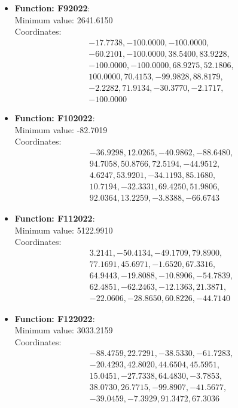 \documentclass{article}
\begin{document}
\begin{itemize}
  \item \textbf{Function: F92022}: \\
    Minimum value: 2641.6150 \\
    Coordinates:
    \[
      \begin{aligned}
        & -17.7738, -100.0000, -100.0000, \\
        & -60.2101, -100.0000, 38.5400, 83.9228, \\
        & -100.0000, -100.0000, 68.9275, 52.1806, \\
        & 100.0000, 70.4153, -99.9828, 88.8179, \\
        & -2.2282, 71.9134, -30.3770, -2.1717, \\
        & -100.0000
      \end{aligned}
    \]

  \item \textbf{Function: F102022}: \\
    Minimum value: -82.7019 \\
    Coordinates:
    \[
      \begin{aligned}
        & -36.9298, 12.0265, -40.9862, -88.6480, \\
        & 94.7058, 50.8766, 72.5194, -44.9512, \\
        & 4.6247, 53.9201, -34.1193, 85.1680, \\
        & 10.7194, -32.3331, 69.4250, 51.9806, \\
        & 92.0364, 13.2259, -3.8388, -66.6743
      \end{aligned}
    \]

  \item \textbf{Function: F112022}: \\
    Minimum value: 5122.9910 \\
    Coordinates:
    \[
      \begin{aligned}
        & 3.2141, -50.4134, -49.1709, 79.8900, \\
        & 77.1691, 45.6971, -1.6520, 67.3316, \\
        & 64.9443, -19.8088, -10.8906, -54.7839, \\
        & 62.4851, -62.2463, -12.1363, 21.3871, \\
        & -22.0606, -28.8650, 60.8226, -44.7140
      \end{aligned}
    \]

  \item \textbf{Function: F122022}: \\
    Minimum value: 3033.2159 \\
    Coordinates:
    \[
      \begin{aligned}
        & -88.4759, 22.7291, -38.5330, -61.7283, \\
        & -20.4293, 42.8020, 44.6504, 45.5951, \\
        & 15.0451, -27.7338, 64.4830, -3.7853, \\
        & 38.0730, 26.7715, -99.8907, -41.5677, \\
        & -39.0459, -7.3929, 91.3472, 67.3036
      \end{aligned}
    \]

\end{itemize}
\end{document}

